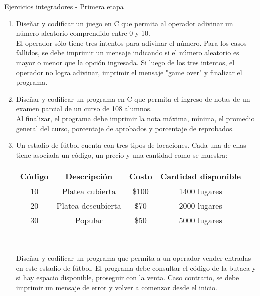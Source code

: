 \documentclass[xcolor=pdftex,table,11pt]{beamer}
\begin{document}
\begin{frame}[allowframebreaks]{Ejercicios integradores - Primera etapa}
 \begin{enumerate}
   
    \item Diseñar y codificar un juego en C que permita al operador adivinar un número aleatorio comprendido entre 0 y 10.\\
    El operador sólo tiene tres intentos para adivinar el número. Para los casos fallidos, se debe imprimir un mensaje indicando si el número aleatorio es mayor o menor que la opción ingresada. Si luego de los tres intentos, el operador no logra adivinar, imprimir el mensaje "game over" y finalizar el programa.
\href{https://github.com/danis963/informaticaI_IUA/blob/main/c/src/6-integrador_1.c}{}    
    
        \item Diseñar y codificar un programa en C que permita el ingreso de notas de un examen parcial de un curso de 108 alumnos.\\
 Al finalizar, el programa debe imprimir la nota máxima, mínima, el promedio general del curso, porcentaje de aprobados y porcentaje de reprobados.
       \href{https://github.com/danis963/informaticaI_IUA/blob/main/c/src/6-integrador_2.c}{}


    
 \item Un estadio de fútbol cuenta con tres tipos de locaciones. Cada una de ellas tiene asociada un código, un precio y una cantidad como se muestra:\\
 
 
\bigskip 

\begin{tabular}{|c|c|c|c|c|}
\hline 
Código & Descripción & Costo & Cantidad disponible \\ 
\hline 
10 & Platea cubierta & \$100 & 1400 lugares \\ 
\hline 
20 & Platea descubierta & \$70 & 2000 lugares \\ 
\hline
30 & Popular & \$50 & 5000 lugares \\ 
\hline 
\end{tabular} 
\

\bigskip 
Diseñar y codificar un programa que permita a un operador vender entradas en este estadio de fútbol. El programa debe consultar el código de la butaca y si hay espacio disponible, proseguir con la venta. Caso contrario, se debe imprimir un mensaje de error y volver a comenzar desde el inicio. \\


\end{enumerate}
\end{frame}
\end{document}
